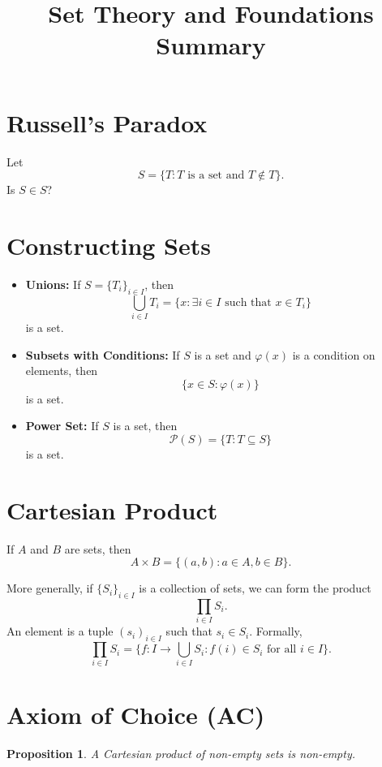 \documentclass{article}
\title{Set Theory and Foundations Summary}
\author{}
\date{}
\newtheorem{proposition}[theorem]{Proposition}
\begin{document}
\maketitle

\section{Russell's Paradox}

Let
\[
S = \{T: T \text{ is a set and } T \notin T\}.
\]
Is \( S \in S \)?

\section{Constructing Sets}

\begin{itemize}
    \item \textbf{Unions:} If \( S = \{T_i\}_{i \in I} \), then
    \[
    \bigcup_{i \in I} T_i = \{x : \exists i \in I \text{ such that } x \in T_i\}
    \]
    is a set.

    \item \textbf{Subsets with Conditions:} If \( S \) is a set and \( \varphi(x) \) is a condition on elements, then
    \[
    \{x \in S : \varphi(x)\}
    \]
    is a set.

    \item \textbf{Power Set:} If \( S \) is a set, then
    \[
    \mathcal{P}(S) = \{T : T \subseteq S\}
    \]
    is a set.
\end{itemize}

\section{Cartesian Product}

If \( A \) and \( B \) are sets, then
\[
A \times B = \{(a,b): a \in A, b \in B\}.
\]

More generally, if \( \{S_i\}_{i \in I} \) is a collection of sets, we can form the product
\[
\prod_{i \in I} S_i.
\]
An element is a tuple \( (s_i)_{i \in I} \) such that \( s_i \in S_i \). Formally,
\[
\prod_{i \in I} S_i = \{f : I \to \bigcup_{i \in I} S_i : f(i) \in S_i \text{ for all } i \in I\}.
\]

\section{Axiom of Choice (AC)}

\begin{proposition}
A Cartesian product of non-empty sets is non-empty.
\end{proposition}
\end{document}
